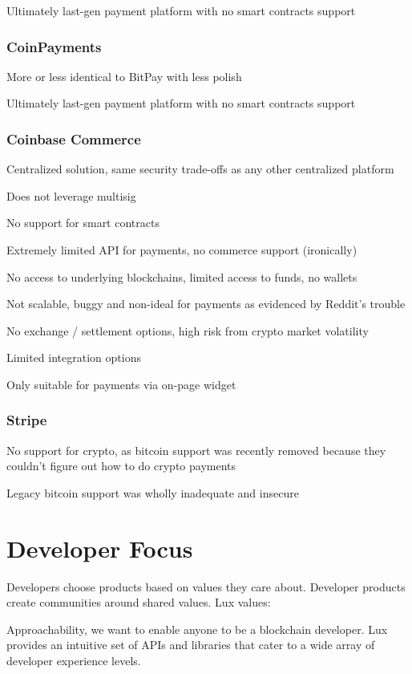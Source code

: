 \documentclass[11pt]{article}
\begin{document}
Ultimately last-gen payment platform with no smart contracts support


\subsubsection{CoinPayments}

More or less identical to BitPay with less polish


Ultimately last-gen payment platform with no smart contracts support


\subsubsection{Coinbase Commerce}

Centralized solution, same security trade-offs as any other centralized platform


Does not leverage multisig


No support for smart contracts


Extremely limited API for payments, no commerce support (ironically)


No access to underlying blockchains, limited access to funds, no wallets


Not scalable, buggy and non-ideal for payments as evidenced by Reddit's trouble


No exchange / settlement options, high risk from crypto market volatility


Limited integration options


Only suitable for payments via on-page widget


\subsubsection{Stripe}

No support for crypto, as bitcoin support was recently removed because they couldn't figure out how to do crypto payments


Legacy bitcoin support was wholly inadequate and insecure


\section{Developer Focus}

Developers choose products based on values they care about. Developer products create communities around shared values. Lux values:


Approachability, we want to enable anyone to be a blockchain developer. Lux provides an intuitive set of APIs and libraries that cater to a wide array of developer experience levels.
\end{document}
